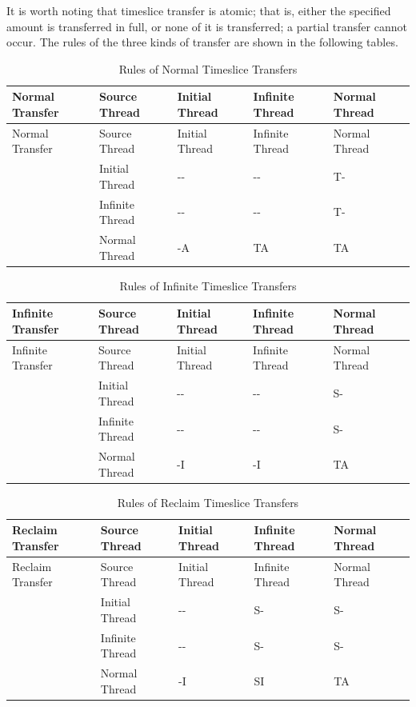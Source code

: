 It is worth noting that timeslice transfer is atomic; that is, either the specified amount is transferred in full, or none of it is transferred; a partial transfer cannot occur. The rules of the three kinds of transfer are shown in the following tables.

\begin{xltabular}{\textwidth}{@{}>{\hsize\raggedright\arraybackslash}X>{\hsize\raggedright\arraybackslash}X>{\hsize\raggedright\arraybackslash}X>{\hsize\raggedright\arraybackslash}X>{\hsize\raggedright\arraybackslash}X@{}}
\caption{Rules of Normal Timeslice Transfers}\label{tab:4-4-normal-time-transfer-rules}\\
\toprule
Normal Transfer & Source Thread & Initial Thread & Infinite Thread & Normal Thread\tabularnewline
\endfirsthead
\toprule
Normal Transfer & Source Thread & Initial Thread & Infinite Thread & Normal Thread\tabularnewline
\midrule
\endhead
\bottomrule
\endlastfoot
{} & Initial Thread & -\/- & -\/- & T-\tabularnewline
& Infinite Thread & -\/- & -\/- & T-\tabularnewline
& Normal Thread & -A & TA & TA\tabularnewline
\end{xltabular}
\nopagebreak[4]

\begin{xltabular}{\textwidth}{@{}>{\hsize\raggedright\arraybackslash}X>{\hsize\raggedright\arraybackslash}X>{\hsize\raggedright\arraybackslash}X>{\hsize\raggedright\arraybackslash}X>{\hsize\raggedright\arraybackslash}X@{}}
\caption{Rules of Infinite Timeslice Transfers}\label{tab:4-5-infinite-time-transfer-rules}\\
\toprule
Infinite Transfer & Source Thread & Initial Thread & Infinite Thread & Normal Thread\tabularnewline
\endfirsthead
\toprule
Infinite Transfer & Source Thread & Initial Thread & Infinite Thread & Normal Thread\tabularnewline
\midrule
\endhead
\bottomrule
\endlastfoot
{} & Initial Thread & -\/- & -\/- & S-\tabularnewline
& Infinite Thread & -\/- & -\/- & S-\tabularnewline
& Normal Thread & -I & -I & TA\tabularnewline
\end{xltabular}
\nopagebreak[4]

\begin{xltabular}{\textwidth}{@{}>{\hsize\raggedright\arraybackslash}X>{\hsize\raggedright\arraybackslash}X>{\hsize\raggedright\arraybackslash}X>{\hsize\raggedright\arraybackslash}X>{\hsize\raggedright\arraybackslash}X@{}}
\caption{Rules of Reclaim Timeslice Transfers}\label{tab:4-6-reclaim-time-transfer-rules}\\
\toprule
Reclaim Transfer & Source Thread & Initial Thread & Infinite Thread & Normal Thread\tabularnewline
\endfirsthead
\toprule
Reclaim Transfer & Source Thread & Initial Thread & Infinite Thread & Normal Thread\tabularnewline
\midrule
\endhead
\bottomrule
\endlastfoot
{} & Initial Thread & -\/- & S- & S-\tabularnewline
& Infinite Thread & -\/- & S- & S-\tabularnewline
& Normal Thread & -I & SI & TA\tabularnewline
\end{xltabular}
\nopagebreak[4]


